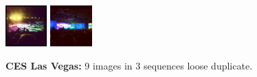 \documentclass{acm_proc_article-sp}
\newcommand{\thumbheight}{16mm}
\newenvironment{thumbsequence}{}{\makebox[4mm]{}}
\begin{document}
\begin{figure}
\begin{centering}
\begin{thumbsequence}
		\includegraphics[height=\thumbheight]{resources/ces/looseduplicate8.jpg}
		\includegraphics[height=\thumbheight]{resources/ces/looseduplicate9.jpg}
	\end{thumbsequence}
	\caption{\textbf{CES Las Vegas:} 9 images in 3 sequences loose duplicate.}
	\label{fig:ces}
\end{centering}
\end{figure}
\end{document}

